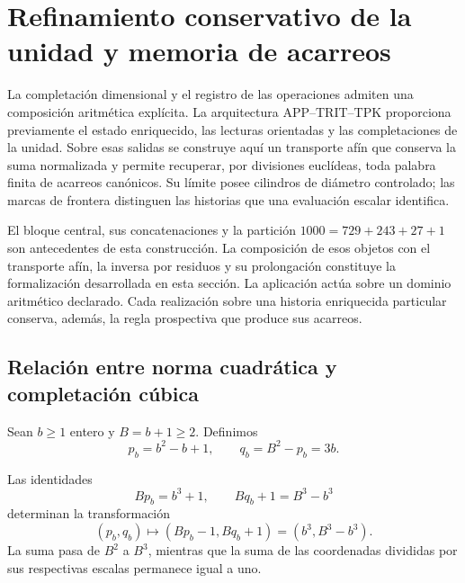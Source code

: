 \chapter{Refinamiento conservativo de la unidad y memoria de acarreos}
\label{x_reciprocidad:lib03:refinamiento}

La completación dimensional y el registro de las operaciones admiten una
composición aritmética explícita. La arquitectura APP--TRIT--TPK proporciona
previamente el estado enriquecido, las lecturas orientadas y las
completaciones de la unidad. Sobre esas salidas se construye aquí un
transporte afín que conserva la suma normalizada y permite recuperar, por
divisiones euclídeas, toda palabra finita de acarreos canónicos. Su límite
posee cilindros de diámetro controlado; las marcas de frontera distinguen
las historias que una evaluación escalar identifica.

El bloque central, sus concatenaciones y la partición
\(1000=729+243+27+1\) son antecedentes de esta construcción. La composición
de esos objetos con el transporte afín, la inversa por residuos y su
prolongación constituye la formalización desarrollada en esta sección.
La aplicación actúa sobre un dominio aritmético declarado. Cada realización
sobre una historia enriquecida particular conserva, además, la regla
prospectiva que produce sus acarreos.

\section{Relación entre norma cuadrática y completación cúbica}
\label{x_reciprocidad:lib03:completacion}

Sean \(b\geq1\) entero y \(B=b+1\geq2\). Definimos
\begin{equation}
 p_b=b^2-b+1,\qquad q_b=B^2-p_b=3b.
 \label{x_reciprocidad:lib03:pb}
\end{equation}

\begin{proposition}
\label{x_reciprocidad:lib03:prop-completacion}
Las identidades
\begin{equation}
 Bp_b=b^3+1,\qquad Bq_b+1=B^3-b^3
 \label{x_reciprocidad:lib03:cuadratica-cubica}
\end{equation}
determinan la transformación
\begin{equation}
 (p_b,q_b)\longmapsto(Bp_b-1,Bq_b+1)
       =(b^3,B^3-b^3).
 \label{x_reciprocidad:lib03:transferencia-cubica}
\end{equation}
La suma pasa de \(B^2\) a \(B^3\), mientras que la suma de las
coordenadas divididas por sus respectivas escalas permanece igual a uno.
\end{proposition}

